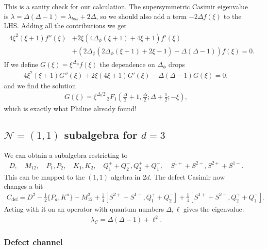 \documentclass[letterpaper]{article}
\let\Oldsubsection\subsection
\renewcommand{\subsection}{\FloatBarrier\Oldsubsection}
\let\Oldsubsubsection\subsubsection
\renewcommand{\subsubsection}{\FloatBarrier\Oldsubsubsection}
\def\Nm{{\mathcal{N}}}
\begin{document}
This is a sanity check for our calculation.
The supersymmetric Casimir eigenvalue is $\lambda = \Delta(\Delta-1) = \lambda_{bos} + 2\Delta$, so we should also add a term $-2 \Delta f(\xi)$ to the LHS.
Adding all the contributions we get
\begin{align}
\begin{split}
    4 \xi ^2 (\xi +1) f''(\xi )
& + 2 \xi  (4 \Delta_\phi (\xi +1) + 4 \xi +1) f'(\xi ) \\
& + \left(
     2 \Delta_\phi (2 \Delta_\phi (\xi +1)+2 \xi -1) -\Delta(\Delta-1)
   \right) f(\xi ) 
 = 0.
\end{split}
\end{align}
If we define $G(\xi) = \xi^{\Delta_\phi} f(\xi)$ the dependence on $\Delta_\phi$ drops
\begin{align}
   4 \xi ^2 (\xi +1)  G''(\xi )
 + 2 \xi (4 \xi +1)   G' (\xi )
 - \Delta (\Delta -1) G  (\xi ) = 0,
\end{align}
and we find the solution
\begin{align}
 G(\xi) = \xi ^{\Delta /2} \, _2F_1\left(\frac{\Delta }{2}+1,\frac{\Delta }{2};\Delta +\frac{1}{2};-\xi \right),
\end{align}
which is exactly what Philine already found!



\subsection{\texorpdfstring{$\Nm = (1, 1)$}{N=(1,1)} subalgebra
for \texorpdfstring{$d = 3$}{d=3}}

We can obtain a subalgebra restricting to
\begin{align}
 D, \quad
 M_{12}, \quad
 P_1, P_2, \quad
 K_1, K_2, \quad
 Q^+_1 + Q^-_2, Q^+_2 + Q^-_1, \quad
 S^{1+} + S^{2-}, S^{2+} + S^{1-}.
\end{align}
This can be mapped to the $(1,1)$ algebra in $2d$.
The defect Casimir now changes a bit
\begin{align}
 C_{\text{def}} = 
    D^2
  - \frac12 \{ P_{a}, K^{a} \}
  - M_{12}^2
  + \frac14 [ S^{2+} + S^{1-}, Q^+_1 + Q^-_2]
  + \frac14 [ S^{1+} + S^{2-}, Q^+_2 + Q^-_1].
\end{align}
Acting with it on an operator with quantum numbers $\Delta, \ell$ gives the eigenvalue:
\begin{align}
 \lambda_C 
 = \Delta (\Delta - 1)
 + \ell^2.
\end{align}


\subsubsection{Defect channel}
\end{document}
